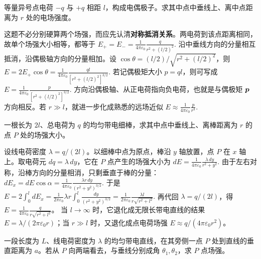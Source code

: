 \documentclass[lang=cn,11pt]{elegantbook}
\begin{document}
\begin{exercise}[电偶极子中垂线上的场强]
等量异号点电荷 \(-q\) 与 \(+q\) 相距 \(l\)，构成电偶极子。求其中点中垂线上、离中点距离为 \(r\) 处的电场强度。
\end{exercise}

\begin{solution}
这题不必分别硬算两个场强，而应先认清\textbf{对称抵消关系}。两电荷到该点距离相同，故单个场强大小相等，都等于
 \(E_+=E_-=\frac{1}{4\pi\varepsilon_0}\frac{q}{r^2+(l/2)^2}.\) 
沿中垂线方向的分量相互抵消，沿偶极轴方向的分量相加。设 \(\cos\theta=(l/2)/\sqrt{r^2+(l/2)^2}\)，则
 \(E=2E_+\cos\theta =\frac{1}{4\pi\varepsilon_0} \frac{ql}{\left[r^2+(l/2)^2\right]^{3/2}}.\) 
若记偶极矩大小 \(p=ql\)，则可写成
 \(E=\frac{1}{4\pi\varepsilon_0} \frac{p}{\left[r^2+(l/2)^2\right]^{3/2}}.\) 
方向沿偶极轴、从正电荷指向负电荷，也就是与偶极矩 \(\vb*{p}\) 方向相反。若 \(r\gg l\)，就进一步化成熟悉的远场近似
 \(E\approx \frac{1}{4\pi\varepsilon_0}\frac{p}{r^3}.\) 
\end{solution}

\begin{exercise}[均匀带电细棒中垂线上的场强]
一根长为 \(2l\)、总电荷为 \(q\) 的均匀带电细棒，求其中点中垂线上、离棒距离为 \(r\) 的点 \(P\) 处的场强大小。
\end{exercise}

\begin{solution}
设线电荷密度 \(\lambda=q/(2l)\)。以细棒中点为原点，棒沿 \(y\) 轴放置，点 \(P\) 在 \(x\) 轴上。取电荷元 \(dq=\lambda\,dy\)，它在 \(P\) 点产生的场强大小为
 \(dE=\frac{1}{4\pi\varepsilon_0}\frac{\lambda\,dy}{r^2+y^2}.\) 
由于左右对称，沿棒方向的分量相消，只剩垂直于棒的分量：
 \(dE_x=dE\cos\alpha =\frac{1}{4\pi\varepsilon_0}\frac{\lambda r\,dy}{(r^2+y^2)^{3/2}}.\) 
于是
 \(E =2\int_0^l dE_x =\frac{1}{2\pi\varepsilon_0}\lambda r\int_0^l\frac{dy}{(r^2+y^2)^{3/2}} =\frac{1}{2\pi\varepsilon_0}\frac{\lambda l}{r\sqrt{r^2+l^2}}.\) 
再代回 \(\lambda=q/(2l)\)，得 \(E=\frac{1}{4\pi\varepsilon_0}\frac{q}{r\sqrt{r^2+l^2}}\)。
当 \(l\to\infty\) 时，它退化成无限长带电直线的结果 \(E=\lambda/(2\pi\varepsilon_0 r)\)；当 \(r\gg l\) 时，又退化成点电荷场强 \(E\approx q/(4\pi\varepsilon_0 r^2)\)。
\end{solution}

\begin{exercise}[有限长均匀带电直线在旁侧一点的场强]
一段长度为 \(L\)、线电荷密度为 \(\lambda\) 的均匀带电直线，在其旁侧一点 \(P\) 处到直线的垂直距离为 \(a\)。若从 \(P\) 向两端看去，与垂线分别成角 \(\theta_1,\theta_2\)，求 \(P\) 点场强。
\end{exercise}
\end{document}
